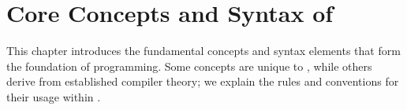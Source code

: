 \chapter{Core Concepts and Syntax of  }

This chapter introduces the fundamental concepts and syntax elements that form the foundation of   programming. Some concepts are unique to , while others derive from established compiler theory; we explain the rules and conventions for their usage within  .














